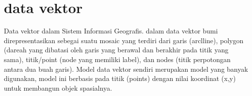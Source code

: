 


\section{data vektor}
  Data vektor dalam Sistem Informasi Geografis. dalam  data vektor bumi direpresentasikan sebegai suatu  mosaic yang terdiri dari garis (arclline), polygon (dareah yang dibatasi oleh garis yang berawal dan berakhir pada titik yang sama), titik/point (node yang memiliki label),  dan nodes (titik perpotongan antara dua buah garis). Model data vektor sendiri merupakan model yang banyak digunakan, model ini berbasis pada titik (points) dengan nilai koordinat (x,y) untuk membangun objek spasialnya. 

